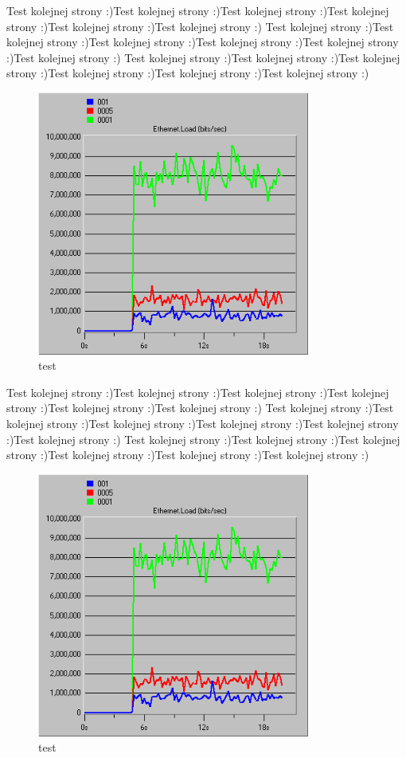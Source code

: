 \documentclass{article}
\begin{document}
Test kolejnej strony :)Test kolejnej strony :)Test kolejnej strony :)Test kolejnej strony :)Test kolejnej strony :)Test kolejnej strony :)
Test kolejnej strony :)Test kolejnej strony :)Test kolejnej strony :)Test kolejnej strony :)Test kolejnej strony :)Test kolejnej strony :)
Test kolejnej strony :)Test kolejnej strony :)Test kolejnej strony :)Test kolejnej strony :)Test kolejnej strony :)Test kolejnej strony :)
\begin{figure}[ht]
  \centering
  \includegraphics[width=0.8\textwidth]{screens/samo/load.png}
  \caption{test}
\end{figure}

Test kolejnej strony :)Test kolejnej strony :)Test kolejnej strony :)Test kolejnej strony :)Test kolejnej strony :)Test kolejnej strony :)
Test kolejnej strony :)Test kolejnej strony :)Test kolejnej strony :)Test kolejnej strony :)Test kolejnej strony :)Test kolejnej strony :)
Test kolejnej strony :)Test kolejnej strony :)Test kolejnej strony :)Test kolejnej strony :)Test kolejnej strony :)Test kolejnej strony :)
\begin{figure}[ht]
  \centering
  \includegraphics[width=0.8\textwidth]{screens/samo/load.png}
  \caption{test}
\end{figure}
\end{document}
